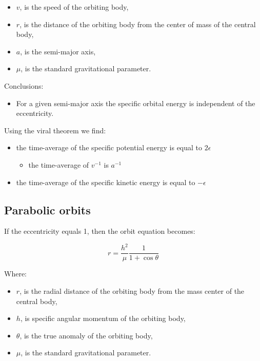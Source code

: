 \documentclass[12pt]{article}
\begin{document}
\begin{itemize}
  \item \(v\), is the speed of the orbiting body,
  \item \(r\), is the distance of the orbiting body from the center of mass of
    the central body,
  \item \(a\), is the semi-major axis,
  \item \(\mu\), is the standard gravitational parameter.
\end{itemize}

Conclusions:

\begin{itemize}
  \item For a given semi-major axis the specific orbital energy is independent
    of the eccentricity.
\end{itemize}

Using the viral theorem we find:

\begin{itemize}
  \item the time-average of the specific potential energy is equal to
    \(2\epsilon\)
    \begin{itemize}
      \item the time-average of \(v^{-1}\) is \(a^{-1}\)
    \end{itemize}
  \item the time-average of the specific kinetic energy is equal to
    \(-\epsilon\)
\end{itemize}

\subsection{Parabolic orbits}

If the eccentricity equals 1, then the orbit equation becomes:

\[r=\frac{h^2}{\mu}\frac{1}{1+\cos\theta}\]

Where:

\begin{itemize}
  \item \(r\), is the radial distance of the orbiting body from the mass center
    of the central body,
  \item \(h\), is specific angular momentum of the orbiting body,
  \item \(\theta\), is the true anomaly of the orbiting body,
  \item \(\mu\), is the standard gravitational parameter.
\end{itemize}
\end{document}
